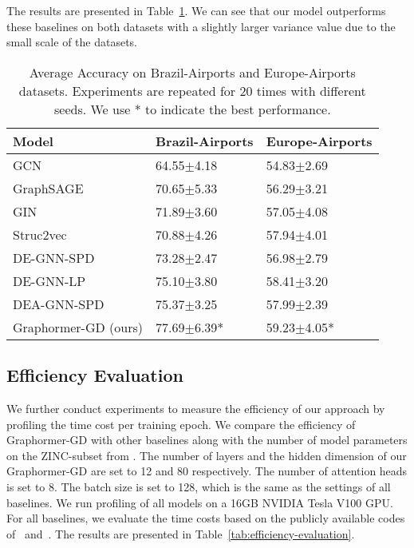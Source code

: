 \documentclass{article} %
\begin{document}
The results are presented in Table~\ref{tab:node-level-tasks}. We can see that our model outperforms these baselines on both datasets with a slightly larger variance value due to the small scale of the datasets.


\begin{table}[h]
    \vspace{-5pt}
    \small
    \centering
    \caption{Average Accuracy on Brazil-Airports and Europe-Airports datasets. Experiments are repeated for 20 times with different seeds. We use * to indicate the best performance.}
    \label{tab:node-level-tasks}
    \vspace{2pt}
    \begin{tabular}{lll}
    \toprule
    Model & Brazil-Airports & Europe-Airports\\
    \midrule
    GCN~\citep{kipf2017semisupervised} & 64.55$\pm$4.18 & 54.83$\pm$2.69\\
    GraphSAGE~\citep{hamilton2017inductive} & 70.65$\pm$5.33 & 56.29$\pm$3.21\\
    GIN~\citep{xu2019powerful} & 71.89$\pm$3.60 & 57.05$\pm$4.08\\
    Struc2vec~\citep{ribeiro2017struc2vec} & 70.88$\pm$4.26 & 57.94$\pm$4.01 \\
    DE-GNN-SPD~\citep{li2020distance} & 73.28$\pm$2.47 & 56.98$\pm$2.79 \\
        DE-GNN-LP~\citep{li2020distance} & 75.10$\pm$3.80 & 58.41$\pm$3.20 \\
    DEA-GNN-SPD~\citep{li2020distance} & 75.37$\pm$3.25 & 57.99$\pm$2.39 \\
    \midrule
    Graphormer-GD (ours) & 77.69$\pm$6.39* & 59.23$\pm$4.05*\\
    \bottomrule
    \end{tabular}
\end{table}

\subsection{Efficiency Evaluation}
We further conduct experiments to measure the efficiency of our approach by profiling the time cost per training epoch.  We
compare the efficiency of Graphormer-GD with other baselines along with the number of model parameters on the ZINC-subset from \citet{dwivedi2020benchmarking}. The number of layers and the hidden dimension of our Graphormer-GD are set to 12 and 80 respectively. The number of attention heads is set to 8. The batch size is set to 128, which is the same as the settings of all baselines. We run profiling of all models on a 16GB NVIDIA Tesla V100 GPU. For all baselines, we evaluate the time costs based on the publicly available codes of~\citet{dwivedi2020benchmarking} and~\citet{ying2021transformers}. The results are presented in Table~\ref{tab:efficiency-evaluation}.
\end{document}
